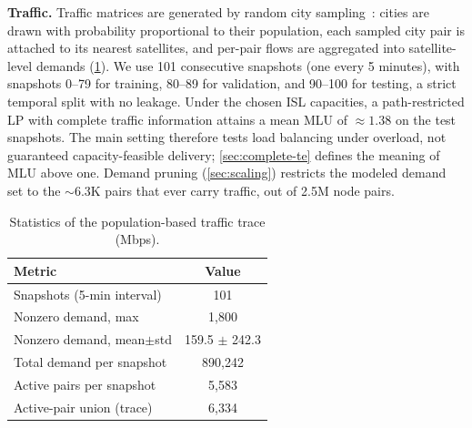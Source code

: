 \textbf{Traffic.} Traffic matrices are generated by random city
sampling~\cite{giuliari2021}: cities are drawn with probability
proportional to their population, each sampled city pair is attached to
its nearest satellites, and per-pair flows are aggregated into
satellite-level demands (\cref{tab:tm-stats}). We use 101 consecutive
snapshots (one every 5 minutes), with snapshots 0--79 for training,
80--89 for validation, and 90--100 for testing, a strict temporal
split with no leakage. Under the chosen ISL capacities, a path-restricted
LP with complete traffic information attains a mean MLU of
${\approx}1.38$ on the test snapshots. The main setting therefore tests load
balancing under overload, not guaranteed capacity-feasible delivery;
\cref{sec:complete-te} defines the meaning of MLU above one. Demand pruning (\cref{sec:scaling})
restricts the modeled
demand set to the ${\sim}6.3$K pairs that ever carry traffic, out of
2.5M node pairs.

\begin{table}[t]
    \caption{Statistics of the population-based traffic trace (Mbps).}
    \label{tab:tm-stats}
    \centering
    \footnotesize
    \setlength{\tabcolsep}{4pt}
    \begin{tabular}{@{}lc@{}}
        \toprule
        Metric & Value \\
        \midrule
        Snapshots (5-min interval) & 101 \\
        Nonzero demand, max & 1{,}800 \\
        Nonzero demand, mean$\pm$std & 159.5 $\pm$ 242.3 \\
        Total demand per snapshot & 890{,}242 \\
        Active pairs per snapshot & 5{,}583 \\
        Active-pair union (trace) & 6{,}334 \\
        \bottomrule
    \end{tabular}
\end{table}

